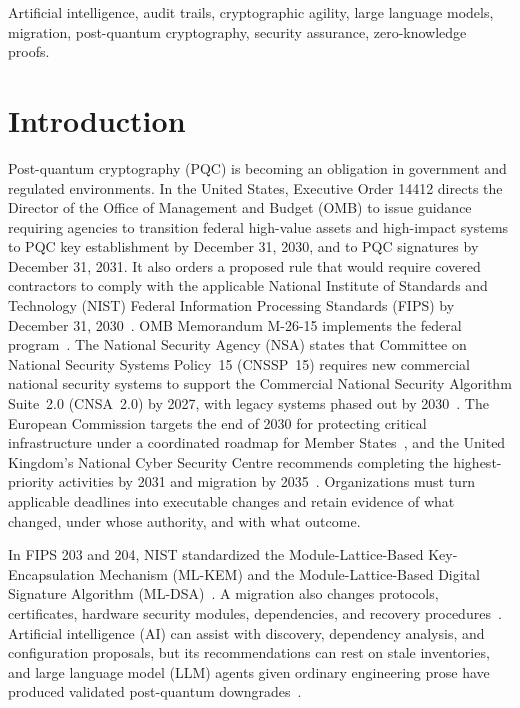 \documentclass[journal]{IEEEtran}
\begin{document}
\begin{IEEEkeywords}
Artificial intelligence, audit trails, cryptographic agility, large language models, migration, post-quantum cryptography, security assurance, zero-knowledge proofs.
\end{IEEEkeywords}

\section{Introduction}
Post-quantum cryptography (PQC) is becoming an obligation in government and regulated environments. In the United States, Executive Order 14412 directs the Director of the Office of Management and Budget (OMB) to issue guidance requiring agencies to transition federal high-value assets and high-impact systems to PQC key establishment by December 31, 2030, and to PQC signatures by December 31, 2031. It also orders a proposed rule that would require covered contractors to comply with the applicable National Institute of Standards and Technology (NIST) Federal Information Processing Standards (FIPS) by December 31, 2030~\cite{eo14412}. OMB Memorandum M-26-15 implements the federal program~\cite{m2615}. The National Security Agency (NSA) states that Committee on National Security Systems Policy~15 (CNSSP~15) requires new commercial national security systems to support the Commercial National Security Algorithm Suite~2.0 (CNSA~2.0) by 2027, with legacy systems phased out by 2030~\cite{nsaarmor}. The European Commission targets the end of 2030 for protecting critical infrastructure under a coordinated roadmap for Member States~\cite{euroadmap,eunews}, and the United Kingdom's National Cyber Security Centre recommends completing the highest-priority activities by 2031 and migration by 2035~\cite{ncsc}. Organizations must turn applicable deadlines into executable changes and retain evidence of what changed, under whose authority, and with what outcome.

In FIPS 203 and 204, NIST standardized the Module-Lattice-Based Key-Encapsulation Mechanism (ML-KEM) and the Module-Lattice-Based Digital Signature Algorithm (ML-DSA)~\cite{fips203,fips204}. A migration also changes protocols, certificates, hardware security modules, dependencies, and recovery procedures~\cite{ir8547,cswp39}. Artificial intelligence (AI) can assist with discovery, dependency analysis, and configuration proposals, but its recommendations can rest on stale inventories, and large language model (LLM) agents given ordinary engineering prose have produced validated post-quantum downgrades~\cite{han}.
\end{document}
